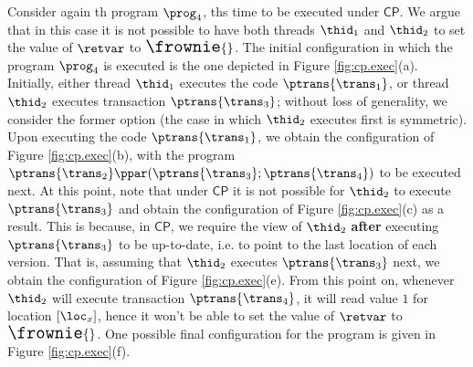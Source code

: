 Consider again th program $\prog_4$, ths time to be executed 
under $\mathsf{CP}$. We argue that in this case it is not possible to have both 
threads $\thid_1$ and $\thid_2$ to set the value of $\retvar$ to ${\Large \frownie{}}$. 
The initial configuration in which the program $\prog_4$ is executed is 
the one depicted in Figure \ref{fig:cp.exec}(a). Initially, either thread $\thid_1$ executes 
the code $\ptrans{\trans_1}$, or thread $\thid_2$ executes transaction $\ptrans{\trans_3}$; without 
loss of generality, we consider the former option (the case in which $\thid_2$ executes 
first is symmetric). Upon executing the code $\ptrans{\trans_1}$, we obtain the 
configuration of Figure \ref{fig:cp.exec}(b), with the program $\ptrans{\trans_2} \ppar (\ptrans{\trans_3} ; \ptrans{\trans_4})$ 
to be executed next.
At this point, note that under $\mathsf{CP}$ it is not possible for $\thid_2$ to execute $\ptrans{\trans_3}$ and obtain 
the configuration of Figure \ref{fig:cp.exec}(c) as a result. This is because, in $\mathsf{CP}$, we require the view of $\thid_2$ 
\textbf{after} executing $\ptrans{\trans_3}$ to be up-to-date, i.e. to point to the last location of each version. That is, 
assuming that $\thid_2$ executes $\ptrans{\trans_3}$ next, we obtain the configuration of Figure \ref{fig:cp.exec}(e). 
From this point on, whenever $\thid_2$ will execute transaction $\ptrans{\trans_4}$, it will read value $1$ for 
location $[\loc_x]$, hence it won't be able to set the value of $\retvar$ to ${\Large \frownie{}}$. One possible 
final configuration for the program is given in Figure \ref{fig:cp.exec}(f).


%

